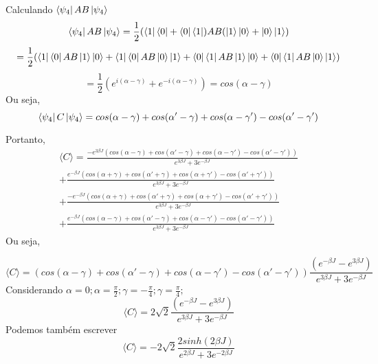 \documentclass[
12pt,				%
openright,			%
oneside,			%
a4paper,			%
english,			%
french,				%
spanish,			%
brazil				%
]{abntex2}
\begin{document}
Calculando $\bra{\psi_4}AB\ket{\psi_4}$
\begin{equation}
	\bra{\psi_4}AB\ket{\psi_4}= \frac{1}{2}(\bra{1}\bra{0}+ \bra{0}\bra{1}) AB(\ket{1}\ket{0}+ \ket{0}\ket{1})
\end{equation}
\begin{equation}
	=\frac{1}{2}(\bra{1}\bra{0}AB\ket{1}\ket{0} + \bra{1}\bra{0}AB\ket{0}\ket{1} +\bra{0}\bra{1}AB\ket{1}\ket{0} + \bra{0}\bra{1}AB\ket{0}\ket{1})
\end{equation}
\begin{equation}
	=\frac{1}{2}(e^{i(\alpha-\gamma)} +e^{-i(\alpha-\gamma)} )=cos(\alpha-\gamma)
\end{equation}
Ou seja,
\begin{equation}
	\bra{\psi_4}C\ket{\psi_4}= cos(\alpha-\gamma) 
	+cos(\alpha'-\gamma) +cos(\alpha-\gamma') - cos(\alpha'-\gamma')
\end{equation}

Portanto,
\begin{multline}
	\langle C \rangle = \frac{-e^{3\beta J}(cos(\alpha-\gamma) +cos(\alpha'-\gamma) +cos(\alpha-\gamma') - cos(\alpha'-\gamma'))}{e^{3\beta J} +3e^{-\beta J}} \\
	+  \frac{e^{-\beta J}(cos(\alpha+\gamma) +cos(\alpha'+\gamma) +cos(\alpha+\gamma') - cos(\alpha'+\gamma'))}{e^{3\beta J} +3e^{-\beta J}} \\ + \frac{-e^{-\beta J}(cos(\alpha+\gamma) +cos(\alpha'+\gamma) +cos(\alpha+\gamma') - cos(\alpha'+\gamma'))}{e^{3\beta J} +3e^{-\beta J}} \\ + \frac{e^{-\beta J}(cos(\alpha-\gamma) +cos(\alpha'-\gamma) +cos(\alpha-\gamma') - cos(\alpha'-\gamma'))}{e^{3\beta J} +3e^{-\beta J}}
\end{multline}
Ou seja,

\begin{equation}
	\langle C \rangle = (cos(\alpha-\gamma) +cos(\alpha'-\gamma) +cos(\alpha-\gamma') - cos(\alpha'-\gamma'))\frac{(e^{-\beta J}-e^{3\beta J})}{e^{3\beta J} +3e^{-\beta J}}
\end{equation}
Considerando $\alpha=0;\alpha=\frac{\pi}{2};\gamma=-\frac{\pi}{4};\gamma=\frac{\pi}{4};$
\begin{equation}
	\langle C \rangle = 2\sqrt{2}\frac{(e^{-\beta J}-e^{3\beta J})}{e^{3\beta J} +3e^{-\beta J}}
\end{equation}
Podemos também escrever 
\begin{equation}
	\langle C \rangle = -2\sqrt{2}\frac{2sinh(2\beta J)}{e^{2\beta J} +3e^{-2\beta J}}
\end{equation}
\end{document}
